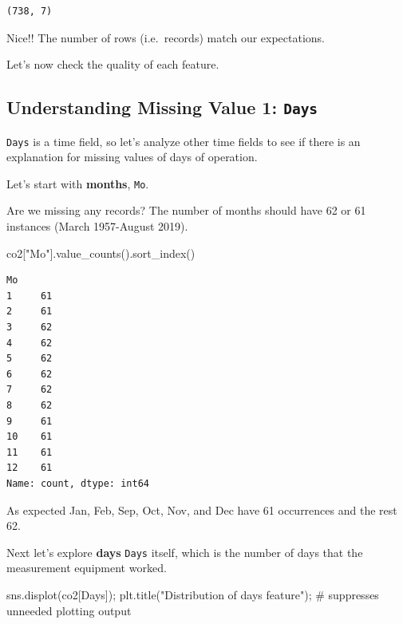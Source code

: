 \documentclass[
  letterpaper,
  DIV=11,
  numbers=noendperiod]{scrreprt}
\newenvironment{Shaded}{\begin{snugshade}}{\end{snugshade}}
\newcommand{\CommentTok}[1]{\textcolor[rgb]{0.37,0.37,0.37}{#1}}
\newcommand{\NormalTok}[1]{\textcolor[rgb]{0.00,0.23,0.31}{#1}}
\newcommand{\OperatorTok}[1]{\textcolor[rgb]{0.37,0.37,0.37}{#1}}
\newcommand{\StringTok}[1]{\textcolor[rgb]{0.13,0.47,0.30}{#1}}
\begin{document}
\begin{verbatim}
(738, 7)
\end{verbatim}

Nice!! The number of rows (i.e.~records) match our expectations.

Let's now check the quality of each feature.

\subsection{\texorpdfstring{Understanding Missing Value 1:
\texttt{Days}}{Understanding Missing Value 1: Days}}\label{understanding-missing-value-1-days}

\texttt{Days} is a time field, so let's analyze other time fields to see
if there is an explanation for missing values of days of operation.

Let's start with \textbf{months}, \texttt{Mo}.

Are we missing any records? The number of months should have 62 or 61
instances (March 1957-August 2019).

\begin{Shaded}
\begin{Highlighting}[]
\NormalTok{co2[}\StringTok{"Mo"}\NormalTok{].value\_counts().sort\_index()}
\end{Highlighting}
\end{Shaded}

\begin{verbatim}
Mo
1     61
2     61
3     62
4     62
5     62
6     62
7     62
8     62
9     61
10    61
11    61
12    61
Name: count, dtype: int64
\end{verbatim}

As expected Jan, Feb, Sep, Oct, Nov, and Dec have 61 occurrences and the
rest 62.

Next let's explore \textbf{days} \texttt{Days} itself, which is the
number of days that the measurement equipment worked.

\begin{Shaded}
\begin{Highlighting}[]
\NormalTok{sns.displot(co2[}\StringTok{\textquotesingle{}Days\textquotesingle{}}\NormalTok{])}\OperatorTok{;}
\NormalTok{plt.title(}\StringTok{"Distribution of days feature"}\NormalTok{)}\OperatorTok{;} \CommentTok{\# suppresses unneeded plotting output}
\end{Highlighting}
\end{Shaded}
\end{document}
